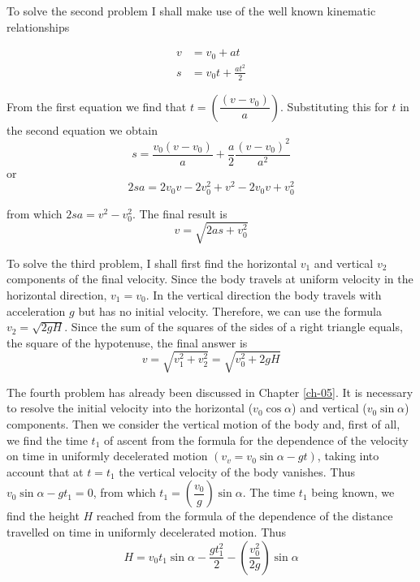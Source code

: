 \documentclass[a4paper,sfsidenotes]{tufte-book}
\begin{document}
To solve the second problem I shall make use of the well known kinematic relationships

\begin{equation*}
\begin{split}
v & = v_{0} + at\\
s & = v_{0}t+ \frac{at^{2}}{2}
\end{split}
\end{equation*}

From the first equation we find that $t= \left(\dfrac{(v - v_{0})}{a}\right)$. Substituting this for $t$ in the second equation we obtain
\begin{equation*}
s = \frac{ v_{0}(v - v_{0})}{a} + \frac{a}{2} \frac{(v - v_{0})^{2}}{a^{2}}
\end{equation*}
or
\begin{equation*}
2sa = 2 v_{0}v - 2v_{0}^{2}+ v^{2} - 2 v_{0}v + v_{0}^{2}
\end{equation*}

from which $2sa=v^{2}-v_{0}^{2}$. The final result is
\begin{equation}
v= \sqrt{2as+v_{0}^{2}}
\label{eq-48}
\end{equation}

To solve the third problem, I shall first find the horizontal $v_{1}$ and vertical $v_{2}$ components of the final velocity. Since the body travels at uniform velocity in the horizontal direction, $v_{1} = v_{0}$. In the vertical direction the body travels with acceleration $g$ but has no initial velocity. Therefore, we can use the formula $v_{2}=\sqrt{2gH}$. Since the sum of the squares of the sides of a right triangle equals, the square of the hypotenuse, the final answer is 
\begin{equation}
v=\sqrt{v_{1}^{2}+v_{2}^{2}} =\sqrt{v_{0}^{2}+2gH}
\label{eq-49}
\end{equation}


The fourth problem has already been discussed in Chapter \ref{ch-05}. It is necessary to resolve the initial velocity into the horizontal ($v_{0} \cos \alpha$) and vertical ($v_{0} \sin \alpha$) components. Then we consider the vertical motion of the body and, first of all, we find the time $t_{1}$ of ascent from the formula for the dependence of the velocity on time in uniformly decelerated motion $(v_{v}=v_{0} \sin \alpha -gt)$, taking into account that at $t=t_{1}$ the vertical velocity of the body vanishes. Thus $v_{0} \sin \alpha -gt_{1} =0$, from which $t_{1} = \left(\dfrac{v_{0}}{g}\right) \sin \alpha$. The time $t_{1}$ being known, we find the height $H$ reached from the formula of the dependence of the distance travelled on time in uniformly decelerated motion. Thus
\begin{equation*}
H = v_{0} t_{1} \sin \alpha - \frac{gt_{1}^{2}}{2} - \left( \frac{v_{0}^{2}}{2g} \right) \sin \alpha
\end{equation*}
\end{document}
